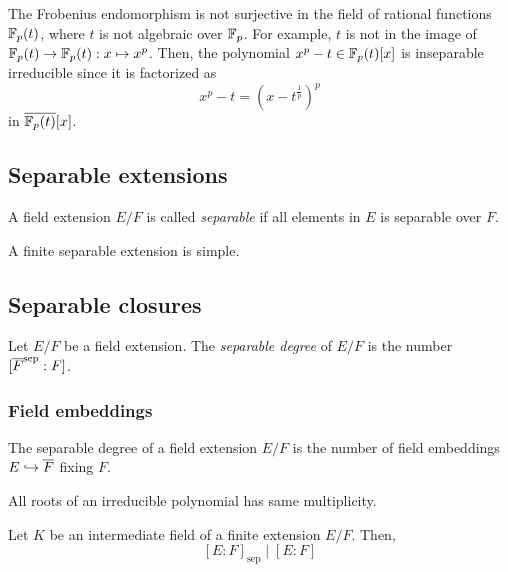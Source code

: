 \documentclass{../exp}
\newcommand{\sep}{\mathrm{sep}}
\begin{document}
\begin{ex}
The Frobenius endomorphism is not surjective in the field of rational functions $\mathbb{F}_p(t)$, where $t$ is not algebraic over $\mathbb{F}_p$.
For example, $t$ is not in the image of $\F_p(t)\to\F_p(t):x\mapsto x^p$.
Then, the polynomial $x^p-t\in\mathbb{F}_p(t)[x]$ is inseparable irreducible since it is factorized as
\[x^p-t=(x-t^{\frac1p})^p\]
in $\overline{\mathbb{F}_p(t)}[x]$.
\end{ex}

\subsection{Separable extensions}
\begin{defn}
A field extension $E/F$ is called \emph{separable} if all elements in $E$ is separable over $F$.
\end{defn}

\begin{thm}
A finite separable extension is simple.
\end{thm}





\subsection{Separable closures}



\begin{defn}
Let $E/F$ be a field extension.
The \emph{separable degree} of $E/F$ is the number $[\cl F^{\sep}:F]$.
\end{defn}



\subsubsection{Field embeddings}

\begin{thm}
The separable degree of a field extension $E/F$ is the number of field embeddings $E\hookrightarrow\overline F$ fixing $F$.
\end{thm}

\begin{lem}
All roots of an irreducible polynomial has same multiplicity.
\end{lem}
\begin{pf}
\end{pf}

\begin{thm}
Let $K$ be an intermediate field of a finite extension $E/F$.
Then,
\[[E:F]_\sep\mid[E:F]\]
\end{thm}
\begin{pf}
\end{pf}
\end{document}
